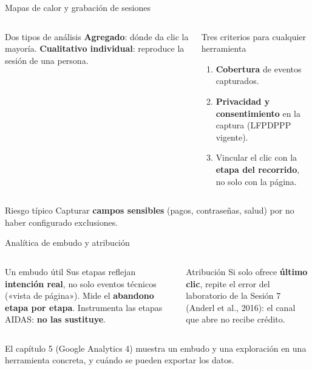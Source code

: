 \documentclass[aspectratio=169,xcolor=dvipsnames]{beamer}
\begin{document}
\begin{frame}{Mapas de calor y grabación de sesiones}
\begin{columns}[T]
  \begin{block}{Dos tipos de análisis}
    \small \textbf{Agregado}: dónde da clic la mayoría. \textbf{Cualitativo individual}: reproduce la sesión de una persona.
  \end{block}
  \begin{exampleblock}{Tres criterios para cualquier herramienta}
    \scriptsize
    \begin{enumerate}
      \item \textbf{Cobertura} de eventos capturados.
      \item \textbf{Privacidad y consentimiento} en la captura (LFPDPPP vigente).
      \item Vincular el clic con la \textbf{etapa del recorrido}, no solo con la página.
    \end{enumerate}
  \end{exampleblock}
\end{columns}
\vspace{4pt}
\begin{alertblock}{Riesgo típico}
  \small Capturar \textbf{campos sensibles} (pagos, contraseñas, salud) por no haber configurado exclusiones.
\end{alertblock}
\end{frame}

\begin{frame}{Analítica de embudo y atribución}
\begin{columns}[T]
  \begin{block}{Un embudo útil}
    \small Sus etapas reflejan \textbf{intención real}, no solo eventos técnicos («vista de página»). Mide el \textbf{abandono etapa por etapa}. Instrumenta las etapas AIDAS: \textbf{no las sustituye}.
  \end{block}
  \begin{alertblock}{Atribución}
    \small Si solo ofrece \textbf{último clic}, repite el error del laboratorio de la Sesión 7 (Anderl et al., 2016): el canal que abre no recibe crédito.
  \end{alertblock}
\end{columns}
\vspace{6pt}
{\small\color{IPNgris} El capítulo 5 (Google Analytics 4) muestra un embudo y una exploración en una herramienta concreta, y cuándo se pueden exportar los datos.}
\end{frame}
\end{document}
